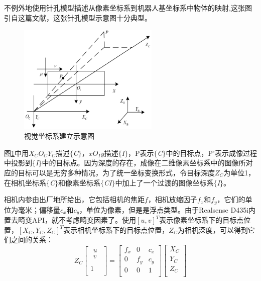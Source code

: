 \documentclass[fontset=fandol,type=bachelor,campus=harbin,bsmainpagenumberline=true]{hithesisbook}
\begin{document}
不例外地使用针孔模型描述从像素坐标系到机器人基坐标系中物体的映射,这张图引自这篇文献\cite{zh1}，这张针孔模型示意图十分典型。
\begin{figure}[h]
\centering
\includegraphics[width = 0.60\textwidth]{chapter2/视觉坐标系建立}
\caption{视觉坐标系建立示意图}
\label{视觉坐标系建立}
\end{figure}


图\ref{视觉坐标系建立}中用$X_CO_CY_C$描述$\lbrace$\textit{C}$\rbrace$，$xO_Iy$描述$\lbrace$\textit{I}$\rbrace$，P表示$\lbrace$\textit{C}$\rbrace$中的目标点，P'表示成像过程中投影到$\lbrace$\textit{I}$\rbrace$中的目标点。因为深度的存在，成像在二维像素坐标系中的图像所对应的目标可以是无穷多种情况，为了统一坐标变换形式，令目标深度$Z_C$为单位1，在相机坐标系$\lbrace$\textit{C}$\rbrace$和像素坐标系$\lbrace$\textit{CI}$\rbrace$中加上了一个过渡的图像坐标系$\lbrace$\textit{I}$\rbrace$。


相机内参由出厂地所给出，它包括相机的焦距$f$，相机放缩因子$f_x$和$f_y$，它们的单位为毫米；偏移量$c_x$和$c_y$，单位为像素，但是是浮点类型。由于Realsense D435i内置去畸变API，就不考虑畸变因素了。使用$\left[ u,v \right] ^T$表示像素坐标系下的目标点位置，$\left[ X_C,Y_C,Z_C \right] ^T$表示相机坐标系下的目标点位置，$Z_C$为相机深度，可以得到它们之间的关系：
\begin{equation}
	Z_C\left[ \begin{array}{c}
	\begin{array}{c}
	u\\
	v\\
\end{array}\\
	1\\
\end{array} \right] =\left[ \begin{matrix}
	f_x&		0&		c_x\\
	0&		f_y&		c_y\\
	0&		0&		1\\
\end{matrix} \right] \left[ \begin{array}{c}
	X_C\\
	Y_C\\
	Z_C\\
\end{array} \right] 
\label{像素到相机坐标变换} 
\end{equation} 
\end{document}
